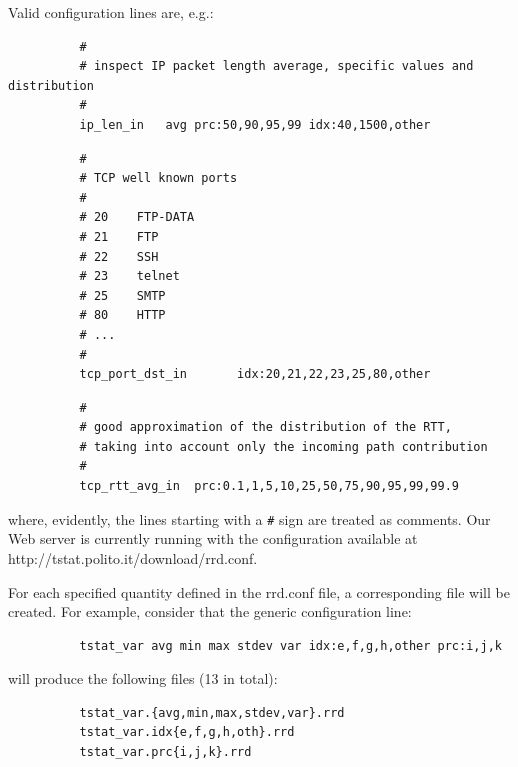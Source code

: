 \documentclass[11pt]{article}
\begin{document}
Valid configuration lines are, e.g.:

\begin{small}\begin{verbatim}
          #
          # inspect IP packet length average, specific values and distribution
          #
          ip_len_in   avg prc:50,90,95,99 idx:40,1500,other
\end{verbatim}\end{small} \noindent
\begin{small}\begin{verbatim}
          #
          # TCP well known ports       
          #                       
          # 20    FTP-DATA             
          # 21    FTP                  
          # 22    SSH                  
          # 23    telnet               
          # 25    SMTP                 
          # 80    HTTP                 
          # ...                        
          #
          tcp_port_dst_in       idx:20,21,22,23,25,80,other
\end{verbatim}\end{small} \noindent
\begin{small}\begin{verbatim}
          #
          # good approximation of the distribution of the RTT,
          # taking into account only the incoming path contribution
          #
          tcp_rtt_avg_in  prc:0.1,1,5,10,25,50,75,90,95,99,99.9
\end{verbatim}\end{small} \noindent
where, evidently, the lines starting with a \texttt{\#} sign are treated as comments.
Our Web server is currently running with the configuration
available at \textsf{http://tstat.polito.it/download/rrd.conf}.



For each specified quantity defined in the rrd.conf file, a corresponding file
will be created.
For example, consider that the generic configuration line:

\begin{small}\begin{verbatim}
          tstat_var avg min max stdev var idx:e,f,g,h,other prc:i,j,k
\end{verbatim}\end{small} \noindent
will produce the following files (13 in total):

\begin{small}\begin{verbatim}
          tstat_var.{avg,min,max,stdev,var}.rrd
          tstat_var.idx{e,f,g,h,oth}.rrd
          tstat_var.prc{i,j,k}.rrd
\end{verbatim}\end{small} \noindent
\end{document}
